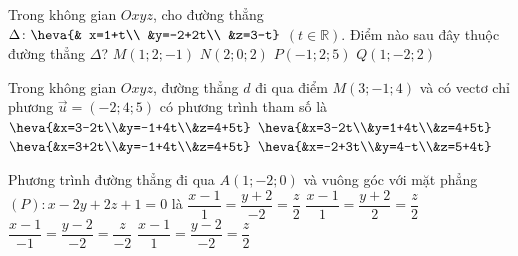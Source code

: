 \begin{ex}%
	Trong không gian $Oxyz$, cho đường thẳng $\Delta\colon  \heva{& x=1+t\\ &y=-2+2t\\ &z=3-t}$ $(t \in \mathbb{R})$. Điểm nào sau đây thuộc đường thẳng $\Delta$?
	 \choice
		 {$M(1;2;-1)$}
		 {\True $N(2;0;2)$}
		 {$P(-1;2;5)$}
		{$Q(1;-2;2)$} 
\end{ex}

\begin{ex}%
	Trong không gian $Oxyz$, đường thẳng $d$ đi qua điểm $M(3;-1;4)$ và có vectơ chỉ phương $\overrightarrow{u}  = (-2;4;5)$ có phương trình tham số là
	\choice 
		 {\True $\heva{&x=3-2t\\&y=-1+4t\\&z=4+5t}$}
		{$\heva{&x=3-2t\\&y=1+4t\\&z=4+5t}$} 
		{$\heva{&x=3+2t\\&y=-1+4t\\&z=4+5t}$} 
		{$\heva{&x=-2+3t\\&y=4-t\\&z=5+4t}$} 
\end{ex}

\begin{ex}%
	[GV:Xuan Vy  Pham]
	Phương trình đường thẳng đi qua $A(1;-2;0)$ và vuông góc với  mặt phẳng \\$(P) \colon x-2y+2z+1=0$ là
	\choice 
		{\True $\dfrac{x-1}{1}=\dfrac{y+2}{-2}=\dfrac{z}{2}$} 
		 {$\dfrac{x-1}{1}=\dfrac{y+2}{2}=\dfrac{z}{2}$}
		 {$\dfrac{x-1}{-1}=\dfrac{y-2}{-2}=\dfrac{z}{-2}$}
		{$\dfrac{x-1}{1}=\dfrac{y-2}{-2}=\dfrac{z}{2}$} 
\end{ex}

